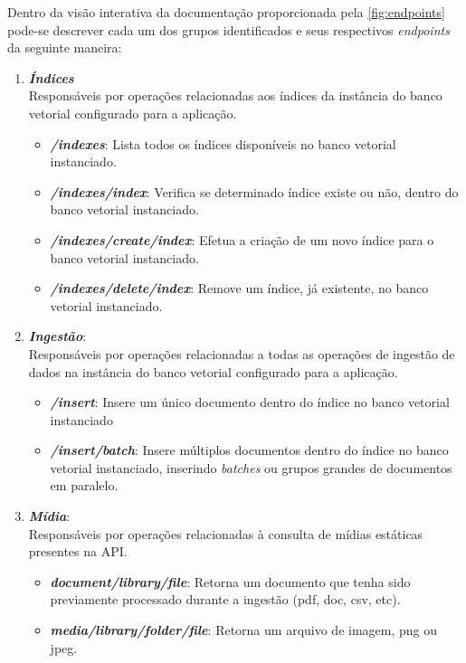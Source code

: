 \documentclass[a4paper, 12pt]{article}
\begin{document}
    Dentro da visão interativa da documentação proporcionada pela \autoref{fig:endpoints} pode-se descrever cada um dos grupos identificados e seus respectivos \textit{endpoints} da seguinte maneira:

    \begin{enumerate}
        \item \textbf{\textit{Índices}}\\
        Responsáveis por operações relacionadas aos índices da instância do banco vetorial configurado para a aplicação.
        \begin{itemize}
            \item \textbf{\textit{/indexes}}: Lista todos os índices disponíveis no banco vetorial instanciado.
            \item \textbf{\textit{/indexes/index}}: Verifica se determinado índice existe ou não, dentro do banco vetorial instanciado.
            \item \textbf{\textit{/indexes/create/index}}: Efetua a criação de um novo índice para o banco vetorial instanciado.
            \item \textbf{\textit{/indexes/delete/index}}: Remove um índice, já existente, no banco vetorial instanciado.
        \end{itemize}
        \item \textbf{\textit{Ingestão}}:\\ Responsáveis por operações relacionadas a todas as operações de ingestão de dados na instância do banco vetorial configurado para a aplicação.
        \begin{itemize}
            \item \textbf{\textit{/insert}}: Insere um único documento dentro do índice no banco vetorial instanciado
            \item \textbf{\textit{/insert/batch}}: Insere múltiplos documentos dentro do índice no banco vetorial instanciado, inserindo \textit{batches} ou grupos grandes de documentos em paralelo.
        \end{itemize}
        \item \textbf{\textit{Mídia}}:\\ Responsáveis por operações relacionadas à consulta de mídias estáticas presentes na API.
        \begin{itemize}
            \item \textbf{\textit{document/library/file}}: Retorna um documento que tenha sido previamente processado durante a ingestão (pdf, doc, csv, etc).
            \item \textbf{\textit{media/library/folder/file}}: Retorna um arquivo de imagem, png ou jpeg.

\end{itemize}
\end{enumerate}
\end{document}

